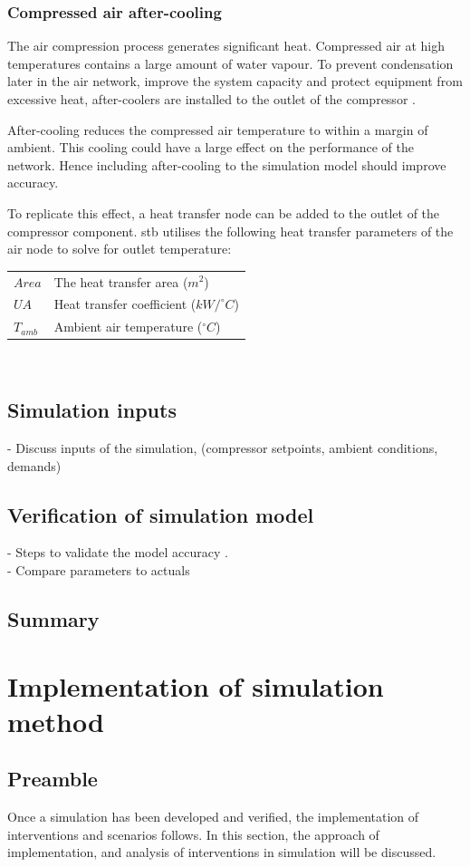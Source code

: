 		\subsubsection{Compressed air after-cooling}
		The air compression process generates significant heat. Compressed air at high temperatures contains a large amount of water vapour. To prevent condensation later in the air network, improve the system capacity and protect equipment from excessive heat, after-coolers are installed to the outlet of the compressor \cite{schroeder2009energy}.
		\par 
		After-cooling reduces the compressed air temperature to within a margin of ambient. This cooling could have a large effect on the performance of the network. Hence including after-cooling to the simulation model should improve accuracy.
		\par 
		To replicate this effect, a heat transfer node can be added to the outlet of the compressor component. \gls{stb} utilises the following heat transfer parameters of the air node to solve for outlet temperature:
		\par 
		\begin{tabular}{p{1.3cm}p{13cm}}
			$Area$ & The heat transfer area ($m^2$) \\
			$UA$ & Heat transfer coefficient ($kW/^{\circ} C$) \\
			$T_{amb}$ & Ambient air temperature ($^{\circ} C$) \\
		\end{tabular} \\	
	\subsection{Simulation inputs}
		- Discuss inputs of the simulation, (compressor setpoints, ambient conditions, demands)
	\subsection{Verification of simulation model}
		- Steps to validate  the model accuracy .\\
		- Compare parameters to actuals
	\subsection{Summary}
\section{Implementation of simulation method}
	\subsection{Preamble}
		Once a simulation has been developed and verified, the implementation of interventions and scenarios follows. In this section, the approach of implementation, and analysis of interventions in simulation will be discussed.
